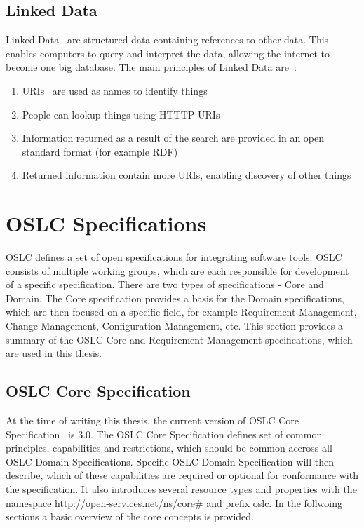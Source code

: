 \subsection*{Linked Data}
Linked Data \cite{linked_data} are structured data containing references to other data. This enables computers to query and interpret the data, allowing the internet to become one big database. The main principles of Linked Data are \cite{linked_data_design_issues}:
\begin{enumerate}
  \item URIs \cite{uri_rfc} are used as names to identify things
  \item People can lookup things using HTTTP URIs
  \item Information returned as a result of the search are provided in an open standard format (for example RDF)
  \item Returned information contain more URIs, enabling discovery of other things
\end{enumerate}

\section{OSLC Specifications}
OSLC defines a set of open specifications for integrating software tools. OSLC consists of multiple working groups, which are each responsible for development of a specific specification. There are two types of specifications - Core and Domain. The Core specification provides a basis for the Domain specifications, which are then focused on a specific field, for example Requirement Management, Change Management, Configuration Management, etc. This section provides a summary of the OSLC Core and Requirement Management specifications, which are used in this thesis.

\subsection{OSLC Core Specification}
At the time of writing this thesis, the current version of OSLC Core Specification \cite{oslc_core_specification} is 3.0. The OSLC Core Specification defines set of common principles, capabilities and restrictions, which should be common accross all OSLC Domain Specifications. Specific OSLC Domain Specification will then describe, which of these capabilities are required or optional for conformance with the specification. It also introduces several resource types and properties with the namespace http://open-services.net/ns/core\# and prefix oslc. In the follwoing sections a basic overview of the core concepts is provided.

